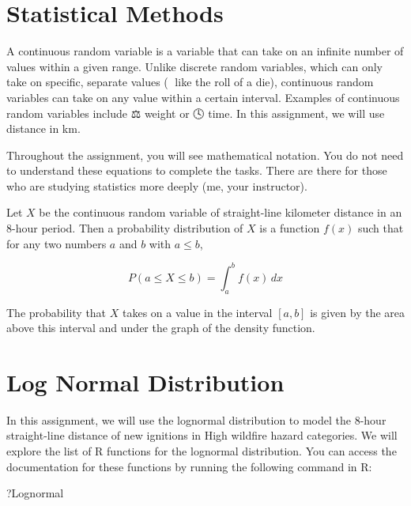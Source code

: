 \documentclass[
  12pt,
]{scrreprt}
\newenvironment{Shaded}{\begin{snugshade}}{\end{snugshade}}
\newcommand{\NormalTok}[1]{#1}
\begin{document}
\section{Statistical Methods}\label{statistical-methods}

A continuous random variable is a variable that can take on an infinite number of values within a given range. Unlike discrete random variables, which can only take on specific, separate values (🎲 like the roll of a die), continuous random variables can take on any value within a certain interval. Examples of continuous random variables include ⚖️ weight or 🕓 time. In this assignment, we will use 📏 distance in km.

Throughout the assignment, you will see mathematical notation. You do not need to understand these equations to complete the tasks. There are there for those who are studying statistics more deeply (me, your instructor).

\begin{customtextbox}

Let $X$ be the continuous random variable of straight-line kilometer distance in an 8-hour period. Then a probability distribution of $X$ is a function $f(x)$ such that for any two numbers $a$ and $b$ with $a \leq b$, 

$$
P(a \leq X \leq b) =  \int_{a}^{b} f(x) \, dx
$$

The probability that $X$ takes on a value in the interval $[a, b]$ is given by the area above this interval and under the graph of the density function. 

\end{customtextbox}

\section{Log Normal Distribution}\label{log-normal-distribution}

In this assignment, we will use the lognormal distribution to model the 8-hour straight-line distance of new ignitions in High wildfire hazard categories. We will explore the list of R functions for the lognormal distribution. You can access the documentation for these functions by running the following command in R:

\begin{Shaded}
\begin{Highlighting}[]
\NormalTok{?Lognormal}
\end{Highlighting}
\end{Shaded}
\end{document}
